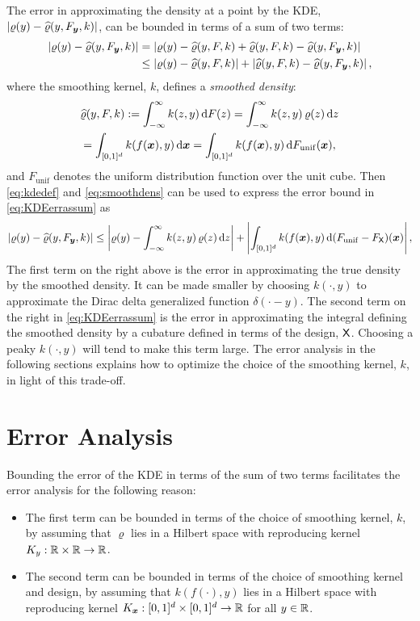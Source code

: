 \documentclass[letterpaper]{amsart}
\newcommand{\hvarrho}{\widehat{\varrho}}
\newcommand{\KY}{K_y}
\newcommand{\KX}{{K_{\vx}}}
\begin{document}
The error in approximating the density at a point by the KDE, $\abs{\varrho(y) - \hvarrho(y,F_{\vy},k)}$, can be bounded in terms of a sum of two terms:
\begin{align}
	\label{eq:KDEerrassum}
	\abs{\varrho(y) - \hvarrho(y,F_{\vy},k)} & =
	\abs{\varrho(y) - \hvarrho(y,F,k) + \hvarrho(y,F,k) - \hvarrho(y,F_{\vy},k)} \\
	\nonumber
	& \le  \abs{\varrho(y) - \hvarrho(y,F,k)} + \abs{\hvarrho(y,F,k) - \hvarrho(y,F_{\vy},k)},
\end{align}
where the smoothing kernel, $k$, defines a \emph{smoothed density}:
\begin{multline}
	\label{eq:smoothdens}
\hvarrho(y,F,k) := \int_{-\infty}^{\infty} k(z,y) \, \dif F(z)
= \int_{-\infty}^{\infty} k(z,y) \, \varrho(z) \, \dif z \\
= \int_{[0,1]^d} k(f(\vx),y) \,  \dif \vx
 = \int_{[0,1]^d} k(f(\vx),y) \,  \dif F_{\mathrm{unif}}(\vx),
\end{multline}
and $F_{\mathrm{unif}}$ denotes the uniform distribution function over the unit cube.  Then \eqref{eq:kdedef} and \eqref{eq:smoothdens} can be used to express the error bound in \eqref{eq:KDEerrassum} as
\begin{equation}
	\label{eq:KDEerrassumA}
	\abs{\varrho(y) - \hvarrho(y,F_{\vy},k)} \le \abs{\varrho(y) - \int_{-\infty}^{\infty} k(z,y) \, \varrho(z) \, \dif z } + \abs{\int_{[0,1]^d} k(f(\vx),y) \,  \dif (F_{\mathrm{unif}} - F_{\mX})(\vx)},
\end{equation}
The first term on the right above is the error in approximating the true density by the smoothed density.  It can be made smaller by choosing $k(\cdot,y)$ to approximate the Dirac delta generalized function $\delta(\cdot - y)$.  The second term on the right in  \eqref{eq:KDEerrassum} is the error in approximating the integral defining the smoothed density by a cubature defined in terms of the design, $\mathsf{X}$.  Choosing a peaky $k(\cdot,y)$  will tend to make this term large.  The error analysis in the following sections explains how to optimize the choice of the smoothing kernel, $k$, in light of this trade-off.



\section{Error Analysis}\label{sec:error_analysis}
Bounding the error of the KDE in terms of the sum of two terms facilitates the error analysis for the following reason:
\begin{itemize}
	\item The first term can be bounded in terms of the choice of smoothing kernel, $k$, by assuming that $\varrho$ lies in a Hilbert space with reproducing kernel $\KY:\reals \times \reals \to \reals$.

	\item The second term can be bounded in terms of the choice of smoothing kernel and design, by assuming that $k(f(\cdot),y)$  lies in a Hilbert space with reproducing kernel $\KX: [0,1]^d \times [0,1]^d\to \reals$ for all $y \in \mathbb{R}$.
\end{itemize}
\end{document}
